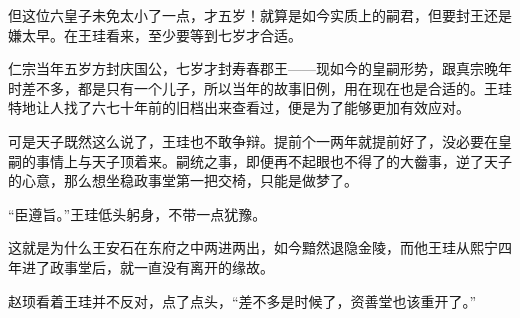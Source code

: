 但这位六皇子未免太小了一点，才五岁！就算是如今实质上的嗣君，但要封王还是嫌太早。在王珪看来，至少要等到七岁才合适。

仁宗当年五岁方封庆国公，七岁才封寿春郡王——现如今的皇嗣形势，跟真宗晚年时差不多，都是只有一个儿子，所以当年的故事旧例，用在现在也是合适的。王珪特地让人找了六七十年前的旧档出来查看过，便是为了能够更加有效应对。

可是天子既然这么说了，王珪也不敢争辩。提前个一两年就提前好了，没必要在皇嗣的事情上与天子顶着来。嗣统之事，即便再不起眼也不得了的大齤事，逆了天子的心意，那么想坐稳政事堂第一把交椅，只能是做梦了。

“臣遵旨。”王珪低头躬身，不带一点犹豫。

这就是为什么王安石在东府之中两进两出，如今黯然退隐金陵，而他王珪从熙宁四年进了政事堂后，就一直没有离开的缘故。

赵顼看着王珪并不反对，点了点头，“差不多是时候了，资善堂也该重开了。”


